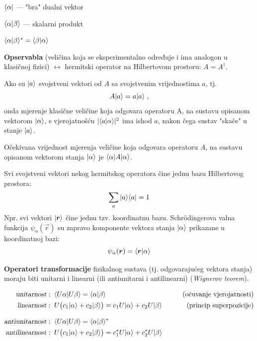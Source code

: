 $\langle \alpha |$ --- "bra" dualni vektor

$\langle \alpha |\beta \rangle$ --- skalarni produkt

$\langle \alpha |\beta \rangle^{*} = \langle \beta |\alpha \rangle$

\textbf{Opservabla} (veličina koja se eksperimentalno određuje i ima
 analogon u klasičnoj fizici) $\leftrightarrow$ hermitski operator na
 Hilbertovom prostoru: $A=A^{\dagger}$.

Ako su $| a \rangle$ svojstveni vektori od $A$ sa svojstvenim vrijednostima
$a$, tj.
\begin{displaymath}
                A| a \rangle=a| a \rangle \;,
\end{displaymath}
onda mjerenje klasične veličine koja odgovara operatoru A, na sustavu
opisanom vektorom $| \alpha \rangle$, s vjerojatnošću $|\langle a |\alpha\rangle|^2$
ima ishod $a$, nakon čega sustav "skače" u stanje $| a \rangle$.

Očekivana vrijednost mjerenja veličine koja odgovara
operatoru $A$, na sustavu opisanom vektorom stanja
$| \alpha \rangle$ je $\langle \alpha |A| \alpha \rangle$.

Svi svojstveni vektori nekog hermitskog operatora čine jednu bazu
Hilbertovog prostora:
\begin{displaymath}
             \sum_{a} | a \rangle\langle a | = 1
\end{displaymath}
Npr. svi vektori $\ket{\vec{r}}$ čine jednu tzv. koordinatnu bazu.
Schr\"{o}dingerova valna funkcija $\psi_{\alpha}(\vec{r})$ su zapravo
komponente vektora stanja $| \alpha \rangle$ prikazane u koordinatnoj
bazi:
\begin{displaymath}
            \psi_{\alpha}(\vec{r})=\bra{\vec{r}}\alpha\rangle
\end{displaymath}


\textbf{Operatori transformacije} fizikalnog sustava (tj. odgovarajućeg vektora
stanja) moraju biti unitarni i linearni (ili antiunitarni i antilinearni)
(\emph{Wignerov teorem}). 

\begin{align*}
\text{\sl unitarnost}&:\; \langle U\alpha |U\beta\rangle = \langle \alpha |\beta\rangle
 \qquad &\text{(očuvanje vjerojatnosti)} \\
\text{\sl linearnost}&:\; U\big(c_1| \alpha \rangle+c_{2}| \beta \rangle\big)=
  c_1 U| \alpha \rangle + c_{2} U| \beta \rangle
 \qquad &\text{(princip superpozicije)} \\[2ex]
\text{\sl antiunitarnost}&:\; \langle U\alpha |U\beta\rangle = \langle \alpha |\beta\rangle^*
  \\
\text{\sl antilinearnost}&:\; U\big(c_1| \alpha \rangle+c_{2}| \beta \rangle\big)=
  c_{1}^* U| \alpha \rangle + c_{2}^* U| \beta \rangle
\end{align*}


